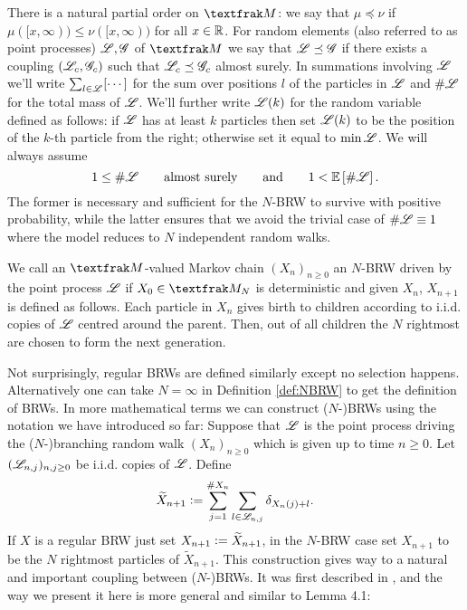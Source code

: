 There is a natural partial order on $\frak{M}$: we say that $\mu \preceq \nu$ if $\mu([x, \infty)) \leq \nu([x, \infty))$ for all $x \in \mathbb{R}$. For random elements (also referred to as point processes) $\mathscr{L}, \mathscr{G}$ of $\frak{M}$ we say that $\mathscr{L} \preceq \mathscr{G}$ if there exists a coupling $(\mathscr{L}_c, \mathscr{G}_c)$ such that $\mathscr{L}_c \preceq \mathscr{G}_c$ almost surely. In summations involving $\mathscr{L}$ we'll write $\sum_{l \in \mathscr{L}} [\cdots]$ for the sum over positions $l$ of the particles in $\mathscr{L}$ and $\#\mathscr{L}$ for the total mass of $\mathscr{L}$. We'll further write $\mathscr{L}(k)$ for the random variable defined as follows: if $\mathscr{L}$ has at least $k$ particles then set $\mathscr{L}(k)$ to be the position of the $k$-th particle from the right; otherwise set it equal to $\min \mathscr{L}$. We will always assume 
\begin{equation}\label{eqn:TreeAssumptions}
1 \leq \# \mathscr{L} \qquad \text{almost surely} \qquad\text{and}\qquad 1 < \mathbb{E}\left[ \# \mathscr{L} \right]. 
\end{equation}
The former is necessary and sufficient for the $N$-BRW to survive with positive probability, while the latter ensures that we avoid the trivial case of $\# \mathscr{L} \equiv 1$ where the model reduces to $N$ independent random walks. \\

\begin{definition}[$N$-BRW]\label{def:NBRW}
We call an $\frak{M}$-valued Markov chain $(X_n)_{n \geq 0}$ an $N$-BRW driven by the point process $\mathscr{L}$ if $X_0 \in \frak{M}_N$ is deterministic and given $X_n$, $X_{n+1}$ is defined as follows. Each particle in $X_n$ gives birth to children according to i.i.d. copies of $\mathscr{L}$ centred around the parent. Then, out of all children the $N$ rightmost are chosen to form the next generation. 
\end{definition}

Not surprisingly, regular BRWs are defined similarly except no selection happens. Alternatively one can take $N = \infty$ in Definition \ref{def:NBRW} to get the definition of BRWs. In more mathematical terms we can construct ($N$-)BRWs using the notation we have introduced so far: Suppose that $\mathscr{L}$ is the point process driving the ($N$-)branching random walk $(X_n)_{n\geq0}$ which is given up to time $n\geq0$. Let $(\mathscr{L}_{n, j})_{n, j \geq 0}$ be i.i.d. copies of $\mathscr{L}$. Define 
\begin{equation}\label{eqn:GeneralConstruction}
\widetilde{X}_{n+1} \vcentcolon= \sum\limits^{\# X_n}_{j=1} \sum\limits_{l \in \mathscr{L}_{n, j}} \delta_{X_n(j) +  l}. 
\end{equation}
If $X$ is a regular BRW just set $X_{n+1} \vcentcolon= \widetilde{X}_{n+1}$, in the $N$-BRW case set $X_{n+1}$ to be the $N$ rightmost particles of $\widetilde{X}_{n+1}$. This construction gives way to a natural and important coupling between ($N$-)BRWs. It was first described in \cite{exp_tails}, and the way we present it here is more general and similar to \cite{mallein2018n} Lemma 4.1:

